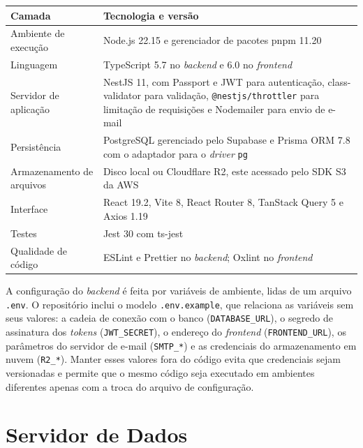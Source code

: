 \FloatBarrier
\begin{quadro}[h!]
\caption{Tecnologias e versões utilizadas na implementação}
\label{quad:versoes}
\begin{tabular}{|p{4cm}|p{11cm}|}
\hline
\textbf{Camada} & \textbf{Tecnologia e versão} \\ \hline
Ambiente de execução & Node.js 22.15 e gerenciador de pacotes pnpm 11.20 \\ \hline
Linguagem & TypeScript 5.7 no \textit{backend} e 6.0 no \textit{frontend} \\ \hline
Servidor de aplicação & NestJS 11, com Passport e JWT para autenticação, class-validator para validação, \texttt{@nestjs/throttler} para limitação de requisições e Nodemailer para envio de e-mail \\ \hline
Persistência & PostgreSQL gerenciado pelo Supabase e Prisma ORM 7.8 com o adaptador para o \textit{driver} \texttt{pg} \\ \hline
Armazenamento de arquivos & Disco local ou Cloudflare R2, este acessado pelo SDK S3 da AWS \\ \hline
Interface & React 19.2, Vite 8, React Router 8, TanStack Query 5 e Axios 1.19 \\ \hline
Testes & Jest 30 com ts-jest \\ \hline
Qualidade de código & ESLint e Prettier no \textit{backend}; Oxlint no \textit{frontend} \\ \hline
\end{tabular}
\end{quadro}
\FloatBarrier

A configuração do \textit{backend} é feita por variáveis de ambiente, lidas de um arquivo \texttt{.env}. O repositório inclui o modelo \texttt{.env.example}, que relaciona as variáveis sem seus valores: a cadeia de conexão com o banco (\texttt{DATABASE\_URL}), o segredo de assinatura dos \textit{tokens} (\texttt{JWT\_SECRET}), o endereço do \textit{frontend} (\texttt{FRONTEND\_URL}), os parâmetros do servidor de e-mail (\texttt{SMTP\_*}) e as credenciais do armazenamento em nuvem (\texttt{R2\_*}). Manter esses valores fora do código evita que credenciais sejam versionadas e permite que o mesmo código seja executado em ambientes diferentes apenas com a troca do arquivo de configuração.

\section{Servidor de Dados}

